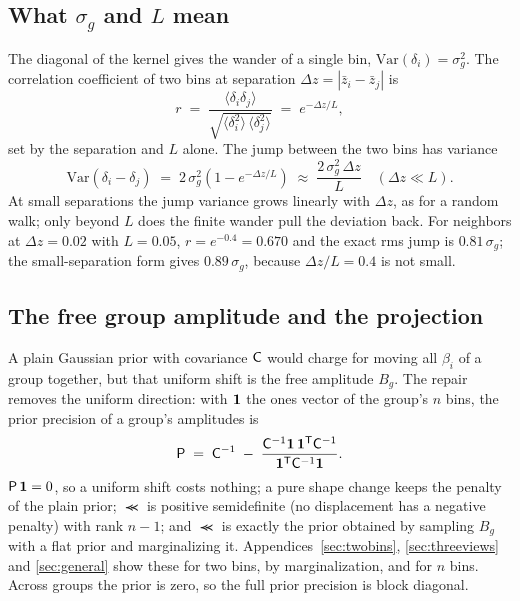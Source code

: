 \subsection{What $\sigma_g$ and $L$ mean}
\label{sec:jump}

The diagonal of the kernel gives the wander of a single bin,
$\mathrm{Var}(\delta_i) = \sigma_g^2$.  The correlation coefficient of
two bins at separation $\Delta z = |\bar{z}_i - \bar{z}_j|$ is
\begin{equation}
  r \;=\;
  \frac{\langle \delta_i \delta_j \rangle}
       {\sqrt{\langle \delta_i^2 \rangle\,\langle \delta_j^2 \rangle}}
  \;=\; e^{-\Delta z / L} ,
  \label{eq:rdef}
\end{equation}
set by the separation and $L$ alone.  The jump between the two bins has
variance
\begin{equation}
  \mathrm{Var}(\delta_i - \delta_j)
  \;=\;
  2\,\sigma_g^2\left(1 - e^{-\Delta z / L}\right)
  \;\approx\;
  \frac{2\,\sigma_g^2\,\Delta z}{L}
  \quad (\Delta z \ll L).
  \label{eq:jumpvar}
\end{equation}
At small separations the jump variance grows linearly with
$\Delta z$, as for a random walk; only beyond $L$ does the finite
wander pull the deviation back.  For neighbors at $\Delta z = 0.02$
with $L = 0.05$, $r = e^{-0.4} = 0.670$ and the exact rms jump is
$0.81\,\sigma_g$; the small-separation form gives $0.89\,\sigma_g$,
because $\Delta z/L = 0.4$ is not small.

\subsection{The free group amplitude and the projection}
\label{sec:projintro}

A plain Gaussian prior with covariance $\mathsf{C}$ would charge for moving
all $\beta_i$ of a group together, but that uniform shift is the free
amplitude $B_g$.  The repair removes the uniform direction: with
$\mathbf{1}$ the ones vector of the group's $n$ bins, the prior precision
of a group's amplitudes is
\begin{equation}
  \mathsf{P} \;=\; \mathsf{C}^{-1}
  \;-\;
  \frac{\mathsf{C}^{-1}\mathbf{1}\,\mathbf{1}^{\mathsf{T}} \mathsf{C}^{-1}}{\mathbf{1}^{\mathsf{T}} \mathsf{C}^{-1} \mathbf{1}}.
  \label{eq:projdef}
\end{equation}
$\mathsf{P}\,\mathbf{1} = 0$, so a uniform shift costs nothing; a pure shape
change keeps the penalty of the plain prior; $\Prec$ is positive
semidefinite (no displacement has a negative penalty) with rank
$n - 1$; and $\Prec$ is exactly the prior
obtained by sampling $B_g$ with a flat prior and marginalizing it.
Appendices~\ref{sec:twobins}, \ref{sec:threeviews} and
\ref{sec:general} show these for two bins, by marginalization, and for
$n$ bins.  Across groups the prior is zero, so the full prior
precision is block diagonal.

